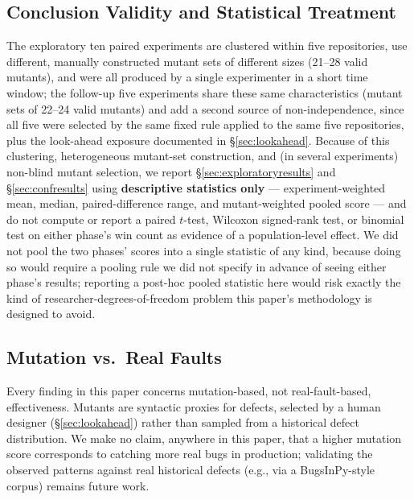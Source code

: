 \documentclass[10pt,conference]{IEEEtran}
\begin{document}
\subsection{Conclusion Validity and Statistical Treatment}
The exploratory ten paired experiments are clustered within five repositories, use different, manually constructed mutant sets of different sizes (21--28 valid mutants), and were all produced by a single experimenter in a short time window; the follow-up five experiments share these same characteristics (mutant sets of 22--24 valid mutants) and add a second source of non-independence, since all five were selected by the same fixed rule applied to the same five repositories, plus the look-ahead exposure documented in \S\ref{sec:lookahead}. Because of this clustering, heterogeneous mutant-set construction, and (in several experiments) non-blind mutant selection, we report \S\ref{sec:exploratoryresults} and \S\ref{sec:confresults} using \textbf{descriptive statistics only} — experiment-weighted mean, median, paired-difference range, and mutant-weighted pooled score — and do not compute or report a paired $t$-test, Wilcoxon signed-rank test, or binomial test on either phase's win count as evidence of a population-level effect. We did not pool the two phases' scores into a single statistic of any kind, because doing so would require a pooling rule we did not specify in advance of seeing either phase's results; reporting a post-hoc pooled statistic here would risk exactly the kind of researcher-degrees-of-freedom problem this paper's methodology is designed to avoid.

\subsection{Mutation vs.\ Real Faults}
Every finding in this paper concerns mutation-based, not real-fault-based, effectiveness. Mutants are syntactic proxies for defects, selected by a human designer (\S\ref{sec:lookahead}) rather than sampled from a historical defect distribution. We make no claim, anywhere in this paper, that a higher mutation score corresponds to catching more real bugs in production; validating the observed patterns against real historical defects (e.g., via a BugsInPy-style corpus) remains future work.
\end{document}
